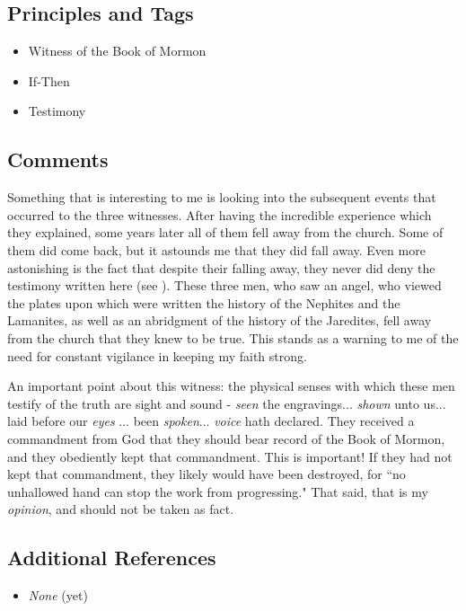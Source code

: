 \documentclass[12pt]{report}
\begin{document}
\subsection{Principles and Tags\label{3witness:principles}}
\begin{itemize}
\item {}Witness of the Book of Mormon
\item {}If-Then
\item {}Testimony
\end{itemize}

\subsection{Comments\label{3witness:comments}}
Something that is interesting to me is looking into the subsequent events that occurred to the three witnesses.  After having the incredible experience which they explained, some years later all of them fell away from the church.  Some of them did come back, but it astounds me that they did fall away.  Even more astonishing is the fact that despite their falling away, they never did deny the testimony written here (see ).  These three men, who saw an angel, who viewed the plates upon which were written the history of the Nephites and the Lamanites, as well as an abridgment of the history of the Jaredites, fell away from the church that they knew to be true.  This stands as a warning to me of the need for constant vigilance in keeping my faith strong.

An important point about this witness: the physical senses with which these men testify of the truth are sight and sound - \emph{seen} the engravings... \emph{shown} unto us... laid before our \emph{eyes} ... been \emph{spoken}... \emph{voice} hath declared.  They received a commandment from God that they should bear record of the Book of Mormon, and they obediently kept that commandment.  This is important!  If they had not kept that commandment, they likely would have been destroyed, for ``no unhallowed hand can stop the work from progressing."  That said, that is my \emph{opinion}, and should not be taken as fact.

\subsection{Additional References\label{3witness:references}}
\begin{itemize}
\item \emph{None} (yet)
\end{itemize}
\end{document}
